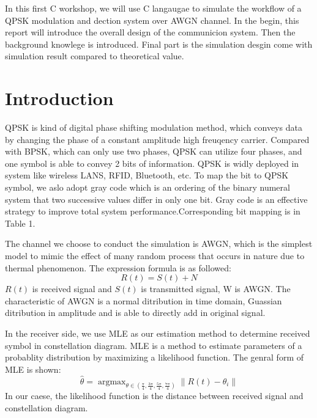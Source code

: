\documentclass[technicalreport]{ieicej}
\begin{document}
\begin{eabstract}
In this first C workshop, we will use C langaugae to simulate the workflow of a QPSK modulation and dection system over AWGN channel. In the begin, this report will introduce the overall design of the communicion system. Then the background knowlege is introduced. Final part is the simulation desgin come with simulation result compared to theoretical value.
\end{eabstract}

\maketitle

\section{Introduction}
QPSK is kind of digital phase shifting modulation method, which conveys data by changing the phase of a constant amplitude high freuqency carrier. Compared with BPSK, which can only use two phases, QPSK can utilize four phases, and one symbol is able to convey 2 bits of information. QPSK is widly deployed in system like wireless LANS, RFID, Bluetooth, etc. To map the bit to QPSK symbol, we aslo adopt gray code which is an ordering of the binary numeral system that two successive values differ in only one bit. Gray code is an effective strategy to improve total system performance.Corresponding bit mapping is in Table 1.\par
The channel we choose to conduct the simulation is AWGN, which is the simplest model to mimic the effect of many random process that occurs in nature due to thermal phenomenon. The  
expression formula is as followed:
\begin{equation}\label{1}
R(t)=S(t)+N
\end{equation}
$R(t)$ is received signal and $S(t)$ is transmitted signal, W is AWGN. The characteristic of AWGN is a normal ditribution in time domain, Guassian ditribution in amplitude and is able to directly add in original signal\cite{wiki:Additive_white_Gaussian_noise}.\par
In the receiver side, we use MLE as our estimation method to determine received symbol in constellation diagram\cite{kay1993fundamentals}. MLE is a method to estimate parameters of a probablity distribution by maximizing a likelihood function. The genral form of MLE is shown:
\begin{equation}\label{2}
 \hat{\theta}=\mathop{\arg\max}_{\theta\in\left ( \frac{\pi}{4},\frac{3\pi}{4},\frac{5\pi}{4},\frac{7\pi}{4}\right ) }\left \| R(t)-\theta_{i} \right \|
\end{equation}
In our caese, the likelihood function is the distance between received signal and constellation diagram.
\end{document}
